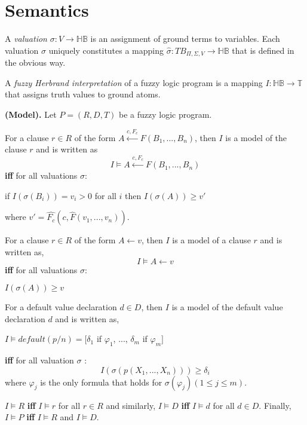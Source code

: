 \section{Semantics}
\label{sec:RFuzzyFrameworkSemantics}
A \textit{valuation} $\sigma : V \rightarrow \mathbb{HB}$ is an assignment of ground terms to variables. Each valuation $\sigma$ uniquely constitutes a mapping $\hat{\sigma} : TB_{\Pi,\Sigma,V} \rightarrow \mathbb{HB}$ that is defined in the obvious way.

A \textit{fuzzy Herbrand interpretation} of a fuzzy logic program is a mapping $I : \mathbb{HB} \rightarrow \mathbb{T}$ that assigns truth values to ground atoms.

\begin{defin}\textbf{(Model).}
\label{def:Model}
Let $P=(R,D,T)$ be a fuzzy logic program.

For a clause $r\in R$ of the form $A \stackrel{c,F_c}{\longleftarrow} F(B_1,...,B_n)$, then $I$ is a model of the clause $r$ and is written as 
\[I \models A \stackrel{c,F_c}{\longleftarrow} F(B_1,...,B_n)\]
\textbf{iff} for all valuations $\sigma$:
\begin{center}
 if $I(\sigma(B_i))=v_i>0$ for all $i$ then $I(\sigma(A))\geq v'$
\end{center}
where $v'= \hat{F_c}(c,\hat{F}(v_1,...,v_n))$.

For a clause $r \in R$ of the form $A \leftarrow v$, then $I$ is a model of a clause $r$ and is written as,
\[I \models A \leftarrow v\]
\textbf{iff} for all valuations $\sigma$:
\begin{center}
 $I(\sigma(A)) \geq v$
\end{center}

For a default value declaration $d \in D$, then $I$ is a model of the default value declaration $d$ and is written as,
\begin{center}
$I \models default(p/n)=[\delta_1$ if $\varphi_1$, ..., $\delta_m$ if $\varphi_m]$
\end{center}
\textbf{iff} for all valuation $\sigma$ :
\[I(\sigma(p(X_1, ..., X_n))) \geq \delta_i\]
where $\varphi_j$ is the only formula that holds for $\sigma(\varphi_j)(1 \leq j \leq m)$.
\end{defin}

$I \models R$ \textbf{iff} $I \models r$ for all $r \in R$ and similarly, $I \models D$ \textbf{iff} $I \models d$ for all $d \in D$.
Finally, $I \models P$ \textbf{iff} $I \models R$ and $I \models D$.
